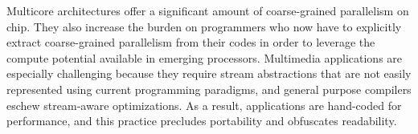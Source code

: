 \vspace{-6pt}
\vspace{-11pt}

Multicore architectures offer a significant amount of coarse-grained
parallelism on chip. They also increase the burden on programmers who
now have to explicitly extract coarse-grained parallelism from their
codes in order to leverage the compute potential available in emerging
processors. Multimedia applications are especially challenging because
they require stream abstractions that are not easily represented using
current programming paradigms, and general purpose compilers eschew
stream-aware optimizations. As a result, applications are hand-coded
for performance, and this practice precludes portability and
obfuscates readability.




